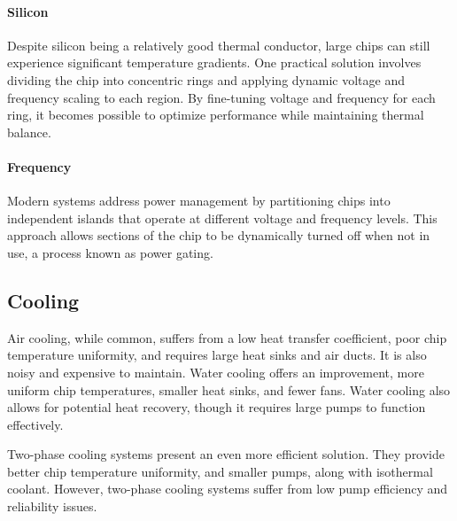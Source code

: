 \paragraph*{Silicon}
Despite silicon being a relatively good thermal conductor, large chips can still experience significant temperature gradients. 
One practical solution involves dividing the chip into concentric rings and applying dynamic voltage and frequency scaling to each region. 
By fine-tuning voltage and frequency for each ring, it becomes possible to optimize performance while maintaining thermal balance.

\paragraph*{Frequency}
Modern systems address power management by partitioning chips into independent islands that operate at different voltage and frequency levels. 
This approach allows sections of the chip to be dynamically turned off when not in use, a process known as power gating. 

\subsection{Cooling}
Air cooling, while common, suffers from a low heat transfer coefficient, poor chip temperature uniformity, and requires large heat sinks and air ducts.
It is also noisy and expensive to maintain. 
Water cooling offers an improvement, more uniform chip temperatures, smaller heat sinks, and fewer fans. 
Water cooling also allows for potential heat recovery, though it requires large pumps to function effectively.

Two-phase cooling systems present an even more efficient solution. 
They provide better chip temperature uniformity, and smaller pumps, along with isothermal coolant. 
However, two-phase cooling systems suffer from low pump efficiency and reliability issues.